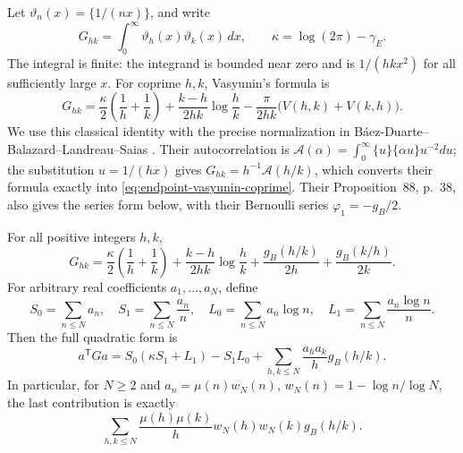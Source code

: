 Let \(\vartheta_n(x)=\{1/(nx)\}\), and write
\[
 G_{hk}=\int_0^\infty\vartheta_h(x)\vartheta_k(x)\,dx,
 \qquad \kappa=\log(2\pi)-\gamma_E.
\]
The integral is finite: the integrand is bounded near zero and is
\(1/(hkx^2)\) for all sufficiently large \(x\).
For coprime \(h,k\), Vasyunin's formula is
\begin{equation}\label{eq:endpoint-vasyunin-coprime}
 G_{hk}=\frac\kappa2\left(\frac1h+\frac1k\right)
       +\frac{k-h}{2hk}\log\frac hk
       -\frac{\pi}{2hk}\bigl(V(h,k)+V(k,h)\bigr).
\end{equation}
We use this classical identity with the precise normalization in
B\'aez-Duarte--Balazard--Landreau--Saias
\cite[Proposition~89, p.~39; definition in Section~4, p.~16]
{bbls-autocorrelation-2003}. Their autocorrelation is
\(\mathcal A(\alpha)=\int_0^\infty\{u\}\{\alpha u\}u^{-2}du\);
the substitution \(u=1/(hx)\) gives
\(G_{hk}=h^{-1}\mathcal A(h/k)\), which converts their formula
exactly into \eqref{eq:endpoint-vasyunin-coprime}.
Their Proposition~88, p.~38, also gives the series form below,
with their Bernoulli series \(\varphi_1=-g_B/2\).

\begin{proposition}
\label{prop:endpoint-signed-gram}
For all positive integers \(h,k\),
\begin{equation}\label{eq:endpoint-gram-sawtooth}
 G_{hk}=\frac\kappa2\left(\frac1h+\frac1k\right)
       +\frac{k-h}{2hk}\log\frac hk
       +\frac{g_B(h/k)}{2h}+\frac{g_B(k/h)}{2k}.
\end{equation}
For arbitrary real coefficients \(a_1,\ldots,a_N\), define
\[
 S_0=\sum_{n\le N}a_n,\quad S_1=\sum_{n\le N}\frac{a_n}{n},
 \quad L_0=\sum_{n\le N}a_n\log n,\quad
 L_1=\sum_{n\le N}\frac{a_n\log n}{n}.
\]
Then the full quadratic form is
\begin{equation}\label{eq:endpoint-full-signed-gram}
 a^{\mathsf T}Ga=S_0(\kappa S_1+L_1)-S_1L_0
           +\sum_{h,k\le N}\frac{a_ha_k}{h}g_B(h/k).
\end{equation}
In particular, for \(N\ge2\) and
\(a_n=\mu(n)w_N(n)\), \(w_N(n)=1-\log n/\log N\),
the last contribution is exactly
\begin{equation}\label{eq:endpoint-mobius-sawtooth}
 \sum_{h,k\le N}\frac{\mu(h)\mu(k)}h
             w_N(h)w_N(k)g_B(h/k).
\end{equation}
\end{proposition}

